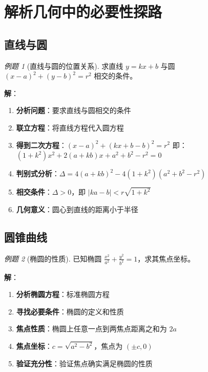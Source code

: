 \documentclass[a4paper,11pt]{ctexart}
\newcommand{\keypoint}[1]{\textcolor{secondary}{\textbf{#1}}}
\theoremstyle{definition}
\theoremstyle{remark}
\newtheorem{example}{例题}[section]
\begin{document}
\newpage

\section{解析几何中的必要性探路}

\subsection{直线与圆}

\begin{example}[直线与圆的位置关系]
求直线 $y = kx + b$ 与圆 $(x-a)^2 + (y-b)^2 = r^2$ 相交的条件。

\textbf{解}：
\begin{enumerate}
    \item \keypoint{分析问题}：要求直线与圆相交的条件
    \item \keypoint{联立方程}：将直线方程代入圆方程
    \item \keypoint{得到二次方程}：$(x-a)^2 + (kx+b-b)^2 = r^2$
    即：$(1+k^2)x^2 + 2(a+kb)x + a^2 + b^2 - r^2 = 0$
    \item \keypoint{判别式分析}：$\Delta = 4(a+kb)^2 - 4(1+k^2)(a^2+b^2-r^2)$
    \item \keypoint{相交条件}：$\Delta > 0$，即 $|ka-b| < r\sqrt{1+k^2}$
    \item \keypoint{几何意义}：圆心到直线的距离小于半径
\end{enumerate}
\end{example}

\subsection{圆锥曲线}

\begin{example}[椭圆的性质]
已知椭圆 $\frac{x^2}{a^2} + \frac{y^2}{b^2} = 1$，求其焦点坐标。

\textbf{解}：
\begin{enumerate}
    \item \keypoint{分析椭圆方程}：标准椭圆方程
    \item \keypoint{寻找必要条件}：椭圆的定义和性质
    \item \keypoint{焦点性质}：椭圆上任意一点到两焦点距离之和为 $2a$
    \item \keypoint{焦点坐标}：$c = \sqrt{a^2 - b^2}$，焦点为 $(\pm c, 0)$
    \item \keypoint{验证充分性}：验证焦点确实满足椭圆的性质
\end{enumerate}
\end{example}
\end{document}

